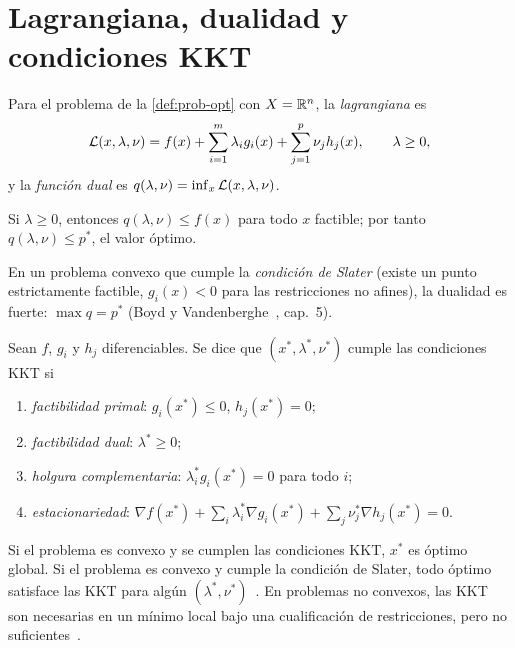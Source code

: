 \section{Lagrangiana, dualidad y condiciones KKT}

\begin{definicion}\label{def:lagrangiana}
Para el problema de la \cref{def:prob-opt} con $X=\mathbb{R}^{n}$, la \emph{lagrangiana} es
\[
\mathcal{L}(x,\lambda,\nu)=f(x)+\sum_{i=1}^{m}\lambda_ig_i(x)+\sum_{j=1}^{p}\nu_jh_j(x),\qquad\lambda\ge 0,
\]
y la \emph{función dual} es $q(\lambda,\nu)=\inf_x\mathcal{L}(x,\lambda,\nu)$.
\end{definicion}

\begin{proposicion}\label{prop:dual-debil-conv}
Si $\lambda\ge 0$, entonces $q(\lambda,\nu)\le f(x)$ para todo $x$ factible; por tanto $q(\lambda,\nu)\le p^{*}$, el valor óptimo.
\end{proposicion}

En un problema convexo que cumple la \emph{condición de Slater} (existe un punto estrictamente factible, $g_i(x)<0$ para las restricciones no afines), la dualidad es fuerte: $\max q=p^{*}$ (Boyd y Vandenberghe~\cite{bv}, cap.~5).

\begin{teorema}\label{teo:kkt}
Sean $f$, $g_i$ y $h_j$ diferenciables. Se dice que $(x^{*},\lambda^{*},\nu^{*})$ cumple las condiciones KKT si
\begin{enumerate}
  \item \emph{factibilidad primal}: $g_i(x^{*})\le 0$, $h_j(x^{*})=0$;
  \item \emph{factibilidad dual}: $\lambda^{*}\ge 0$;
  \item \emph{holgura complementaria}: $\lambda_i^{*}g_i(x^{*})=0$ para todo $i$;
  \item \emph{estacionariedad}: $\nabla f(x^{*})+\sum_i\lambda_i^{*}\nabla g_i(x^{*})+\sum_j\nu_j^{*}\nabla h_j(x^{*})=0$.
\end{enumerate}
Si el problema es convexo y se cumplen las condiciones KKT, $x^{*}$ es óptimo global. Si el problema es convexo y cumple la condición de Slater, todo óptimo satisface las KKT para algún $(\lambda^{*},\nu^{*})$~\cite{bv}. En problemas no convexos, las KKT son necesarias en un mínimo local bajo una cualificación de restricciones, pero no suficientes~\cite{nw}.
\end{teorema}


